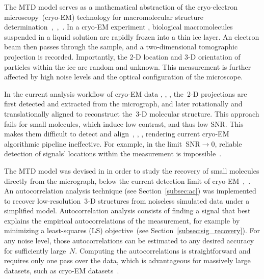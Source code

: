 \documentclass{article}
\begin{document}
The MTD model serves as a mathematical abstraction of the cryo-electron microscopy~(\mbox{cryo-EM}) technology for macromolecular structure determination~\cite{henderson1995potential},~\cite{nogales2016development},~\cite{bai2015cryo}. In a \mbox{cryo-EM} experiment \cite{frank2006three}, biological macromolecules suspended in a liquid solution are rapidly frozen into a thin ice layer. An electron beam then passes through the sample, and a two-dimensional tomographic projection is recorded. Importantly, the \mbox{2-D} location and \mbox{3-D} orientation of particles within the ice are random and unknown. This measurement is further affected by high noise levels and the optical configuration of the microscope.

In the current analysis workflow of \mbox{cryo-EM} data \cite{bendory2020single}, \cite{scheres2012relion}, \cite{punjani2017cryosparc}, the~\mbox{2-D} projections are first detected and extracted from the micrograph, and later rotationally and translationally aligned to reconstruct the~\mbox{3-D} molecular structure. This approach fails for small molecules, which induce low contrast, and thus low SNR. This makes them difficult to detect and align~\cite{bendory2018toward}, \cite{henderson1995potential}, \cite{aguerrebere2016fundamental}, rendering current \mbox{cryo-EM} algorithmic pipeline ineffective. For example, in the limit~\mbox{$\text{SNR} \rightarrow 0$}, reliable detection of signals' locations within the measurement is impossible~\cite[Proposition~3.1]{bendory2018toward}.

The MTD model was devised in \cite{bendory2018toward} in order to study the recovery of small molecules directly from the micrograph, below the current detection limit of \mbox{cryo-EM}~\cite{henderson1995potential},~\cite{d2021current}. An autocorrelation analysis technique (see Section~\ref{subsec:ac}) was implemented to recover \mbox{low-resolution}~\mbox{3-D} structures from noiseless simulated data under a simplified model. Autocorrelation analysis consists of finding a signal that best explains the empirical autocorrelations of the measurement, for example by minimizing a {least-squares} (LS) objective~(see Section~\ref{subsec:sig_recovery}). For any noise level, those autocorrelations can be estimated to any desired accuracy for sufficiently large~$N$. Computing the autocorrelations is straightforward and requires only one pass over the data, which is advantageous for massively large datasets, such as \mbox{cryo-EM} datasets~\cite{bendory2020single}.
\end{document}
